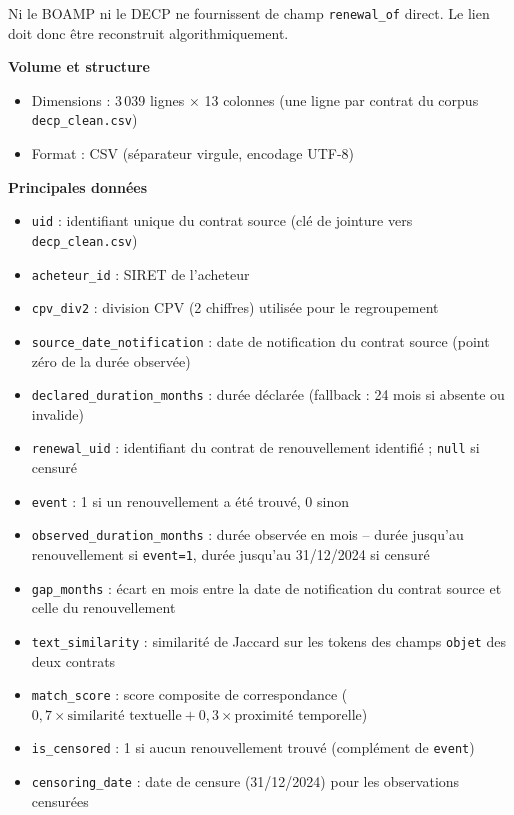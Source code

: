 \documentclass[12pt,a4paper]{article}
\begin{document}
Ni le BOAMP ni le DECP ne fournissent de champ \texttt{renewal\_of} direct.
Le lien doit donc être reconstruit algorithmiquement.

\medskip
\textbf{Volume et structure}

\begin{itemize}
  \item[---] Dimensions : 3\,039 lignes × 13 colonnes (une ligne par contrat
    du corpus \texttt{decp\_clean.csv})
  \item[---] Format : CSV (séparateur virgule, encodage UTF-8)
\end{itemize}

\medskip
\textbf{Principales données}

\begin{itemize}
  \item[---] \texttt{uid} : identifiant unique du contrat source
    (clé de jointure vers \texttt{decp\_clean.csv})
  \item[---] \texttt{acheteur\_id} : SIRET de l'acheteur
  \item[---] \texttt{cpv\_div2} : division CPV (2 chiffres) utilisée pour le
    regroupement
  \item[---] \texttt{source\_date\_notification} : date de notification du
    contrat source (point zéro de la durée observée)
  \item[---] \texttt{declared\_duration\_months} : durée déclarée
    (fallback : 24 mois si absente ou invalide)
  \item[---] \texttt{renewal\_uid} : identifiant du contrat de renouvellement
    identifié ; \texttt{null} si censuré
  \item[---] \texttt{event} : 1 si un renouvellement a été trouvé, 0 sinon
  \item[---] \texttt{observed\_duration\_months} : durée observée en mois --
    durée jusqu'au renouvellement si \texttt{event=1}, durée jusqu'au
    31/12/2024 si censuré
  \item[---] \texttt{gap\_months} : écart en mois entre la date de notification
    du contrat source et celle du renouvellement
  \item[---] \texttt{text\_similarity} : similarité de Jaccard sur les tokens
    des champs \texttt{objet} des deux contrats
  \item[---] \texttt{match\_score} : score composite de correspondance
    ($0{,}7 \times \text{similarité textuelle} + 0{,}3 \times \text{proximité temporelle}$)
  \item[---] \texttt{is\_censored} : 1 si aucun renouvellement trouvé
    (complément de \texttt{event})
  \item[---] \texttt{censoring\_date} : date de censure (31/12/2024) pour les
    observations censurées
\end{itemize}
\end{document}
